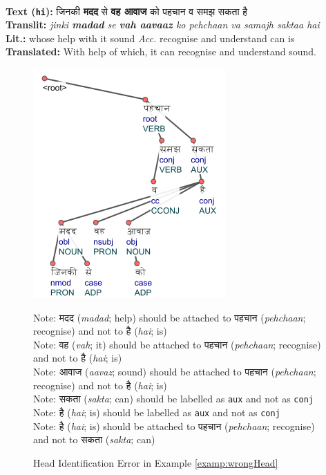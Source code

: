 \begin{example}
\label{examp:wrongHead}
\textbf{ }\\
\textbf{Text (\texttt{hi}):} \texthindi{जिनकी \textbf{मदद} से \textbf{वह आवाज} को पहचान व समझ सकता है}\\
\textbf{Translit:} \textit{jinki \textbf{madad} se \textbf{vah aavaaz} ko pehchaan va samajh saktaa hai}\\
\textbf{Lit.:} whose help with it sound \textit{Acc.} recognise and understand can is\\
\textbf{Translated:} With help of which, it can recognise and understand sound.
\end{example}

\begin{figure}[H]
    \centering
    \includegraphics[scale=0.90]{img/wrongHead.png}
    \caption{Head Identification Error in Example \ref{examp:wrongHead}}
    Note: \texthindi{मदद} (\textit{madad}; help) should be attached to \texthindi{पहचान} (\textit{pehchaan}; recognise) and not to \texthindi{है} (\textit{hai}; is)\\
    Note: \texthindi{वह} (\textit{vah}; it) should be attached to \texthindi{पहचान} (\textit{pehchaan}; recognise) and not to \texthindi{है} (\textit{hai}; is)\\
    Note: \texthindi{आवाज} (\textit{aavaz}; sound) should be attached to \texthindi{पहचान} (\textit{pehchaan}; recognise) and not to \texthindi{है} (\textit{hai}; is)\\
    Note: \texthindi{सकता} (\textit{sakta}; can) should be labelled as \texttt{aux} and not as \texttt{conj}\\
    Note: \texthindi{है} (\textit{hai}; is) should be labelled as \texttt{aux} and not as \texttt{conj}\\
    Note: \texthindi{है} (\textit{hai}; is) should be attached to \texthindi{पहचान} (\textit{pehchaan}; recognise) and not to \texthindi{सकता} (\textit{sakta}; can)
    \label{examp:wrongHead-fig}
\end{figure}

